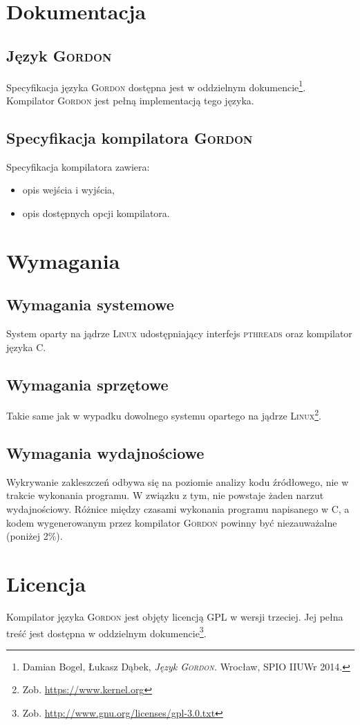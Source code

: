 \documentclass{documentation}
\begin{document}
\section{Dokumentacja}
\subsection{Język \textsc{Gordon}}
\noindent Specyfikacja języka \textsc{Gordon} dostępna jest w oddzielnym
dokumencie\footnote{Damian Bogel, Łukasz Dąbek, \emph{Język \textsc{Gordon}.}
Wrocław, SPIO IIUWr 2014. }. Kompilator \textsc{Gordon} jest pełną
implementacją tego języka.

\subsection{Specyfikacja kompilatora \textsc{Gordon}}
\noindent Specyfikacja kompilatora zawiera:
\begin{itemize}
\item opis wejścia i wyjścia,
\item opis dostępnych opcji kompilatora.
\end{itemize}

\section{Wymagania}
\subsection{Wymagania systemowe}
\noindent System oparty na jądrze \textsc{Linux} udostępniający interfejs
\textsc{pthreads} oraz kompilator języka C.

\subsection{Wymagania sprzętowe}
\noindent Takie same jak w wypadku dowolnego systemu opartego na jądrze
\textsc{Linux}\footnote{Zob. \url{https://www.kernel.org}}.

\subsection{Wymagania wydajnościowe}
\noindent Wykrywanie zakleszczeń odbywa się na poziomie analizy kodu
źródłowego, nie w trakcie wykonania programu. W związku z tym, nie powstaje
żaden narzut wydajnościowy. Różnice między czasami wykonania programu
napisanego w C, a kodem wygenerowanym przez kompilator \textsc{Gordon} powinny
być niezauważalne (poniżej 2\%).

\section{Licencja}
\noindent Kompilator języka \textsc{Gordon} jest objęty licencją GPL w wersji
trzeciej. Jej pełna treść jest dostępna w oddzielnym dokumencie\footnote{Zob.
\url{http://www.gnu.org/licenses/gpl-3.0.txt}}.
\end{document}
